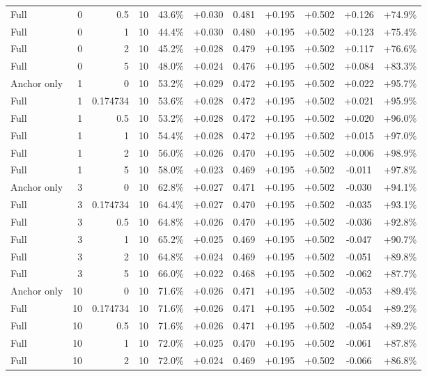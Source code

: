 \begin{table}[htbp]
\begin{tabular}{lrrrccccccc}
Full & 0 & 0.5 & 10 & 43.6\% & +0.030 & 0.481 & +0.195 & +0.502 & +0.126 & +74.9\% \\
Full & 0 & 1 & 10 & 44.4\% & +0.030 & 0.480 & +0.195 & +0.502 & +0.123 & +75.4\% \\
Full & 0 & 2 & 10 & 45.2\% & +0.028 & 0.479 & +0.195 & +0.502 & +0.117 & +76.6\% \\
Full & 0 & 5 & 10 & 48.0\% & +0.024 & 0.476 & +0.195 & +0.502 & +0.084 & +83.3\% \\
Anchor only & 1 & 0 & 10 & 53.2\% & +0.029 & 0.472 & +0.195 & +0.502 & +0.022 & +95.7\% \\
Full & 1 & 0.174734 & 10 & 53.6\% & +0.028 & 0.472 & +0.195 & +0.502 & +0.021 & +95.9\% \\
Full & 1 & 0.5 & 10 & 53.2\% & +0.028 & 0.472 & +0.195 & +0.502 & +0.020 & +96.0\% \\
Full & 1 & 1 & 10 & 54.4\% & +0.028 & 0.472 & +0.195 & +0.502 & +0.015 & +97.0\% \\
Full & 1 & 2 & 10 & 56.0\% & +0.026 & 0.470 & +0.195 & +0.502 & +0.006 & +98.9\% \\
Full & 1 & 5 & 10 & 58.0\% & +0.023 & 0.469 & +0.195 & +0.502 & -0.011 & +97.8\% \\
Anchor only & 3 & 0 & 10 & 62.8\% & +0.027 & 0.471 & +0.195 & +0.502 & -0.030 & +94.1\% \\
Full & 3 & 0.174734 & 10 & 64.4\% & +0.027 & 0.470 & +0.195 & +0.502 & -0.035 & +93.1\% \\
Full & 3 & 0.5 & 10 & 64.8\% & +0.026 & 0.470 & +0.195 & +0.502 & -0.036 & +92.8\% \\
Full & 3 & 1 & 10 & 65.2\% & +0.025 & 0.469 & +0.195 & +0.502 & -0.047 & +90.7\% \\
Full & 3 & 2 & 10 & 64.8\% & +0.024 & 0.469 & +0.195 & +0.502 & -0.051 & +89.8\% \\
Full & 3 & 5 & 10 & 66.0\% & +0.022 & 0.468 & +0.195 & +0.502 & -0.062 & +87.7\% \\
Anchor only & 10 & 0 & 10 & 71.6\% & +0.026 & 0.471 & +0.195 & +0.502 & -0.053 & +89.4\% \\
Full & 10 & 0.174734 & 10 & 71.6\% & +0.026 & 0.471 & +0.195 & +0.502 & -0.054 & +89.2\% \\
Full & 10 & 0.5 & 10 & 71.6\% & +0.026 & 0.471 & +0.195 & +0.502 & -0.054 & +89.2\% \\
Full & 10 & 1 & 10 & 72.0\% & +0.025 & 0.470 & +0.195 & +0.502 & -0.061 & +87.8\% \\
Full & 10 & 2 & 10 & 72.0\% & +0.024 & 0.469 & +0.195 & +0.502 & -0.066 & +86.8\% \\

\end{tabular}
\end{table}
